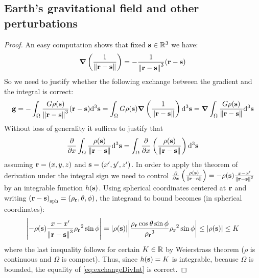 \documentclass[../main.tex]{subfiles}
\begin{document}
\subsection{Earth's gravitational field and other perturbations}\label{sec:app3}
\thmconservative*
\begin{proof}
  An easy computation shows that fixed $\boldsymbol{\mathrm{s}}\in\mathbb{R}^3$ we have:
  \begin{equation}
    \grad\left(\frac{1}{\left\|\boldsymbol{\mathrm{r}}-\boldsymbol{\mathrm{s}}\right\|}\right)=-\frac{1}{\left\|\boldsymbol{\mathrm{r}}-\boldsymbol{\mathrm{s}}\right\|^3}(\boldsymbol{\mathrm{r}}-\boldsymbol{\mathrm{s}})
  \end{equation}
  So we need to justify whether the following exchange between the gradient and the integral is correct:
  \begin{equation}
    \boldsymbol{\mathrm{g}}=-\int_{\Omega}\frac{G\rho(\boldsymbol{\mathrm{s}})}{\left\|\boldsymbol{\mathrm{r}}-\boldsymbol{\mathrm{s}}\right\|^3}(\boldsymbol{\mathrm{r}}-\boldsymbol{\mathrm{s}})\dd^3{\boldsymbol{\mathrm{s}}}=\int_{\Omega}G\rho(\boldsymbol{\mathrm{s}})\grad\left(\frac{1}{\left\|\boldsymbol{\mathrm{r}}-\boldsymbol{\mathrm{s}}\right\|}\right)\dd^3{\boldsymbol{\mathrm{s}}}=\grad\int_{\Omega}\frac{G\rho(\boldsymbol{\mathrm{s}})}{\left\|\boldsymbol{\mathrm{r}}-\boldsymbol{\mathrm{s}}\right\|}\dd^3{\boldsymbol{\mathrm{s}}}
  \end{equation}
  Without loss of generality it suffices to justify that
  \begin{equation}\label{eq:exchangeDivInt}
    \pdv{}{x}\int_{\Omega}\frac{\rho(\boldsymbol{\mathrm{s}})}{\left\|\boldsymbol{\mathrm{r}}-\boldsymbol{\mathrm{s}}\right\|}\dd^3{\boldsymbol{\mathrm{s}}}=\int_{\Omega}\pdv{}{x}\left(\frac{\rho(\boldsymbol{\mathrm{s}})}{\left\|\boldsymbol{\mathrm{r}}-\boldsymbol{\mathrm{s}}\right\|}\right)\dd^3{\boldsymbol{\mathrm{s}}}
  \end{equation}
  assuming $\boldsymbol{\mathrm{r}}=(x,y,z)$ and $\boldsymbol{\mathrm{s}}=(x',y',z')$. In order to apply the theorem of derivation under the integral sign we need to control $\pdv{}{x}\left(\frac{\rho(\boldsymbol{\mathrm{s}})}{\left\|\boldsymbol{\mathrm{r}}-\boldsymbol{\mathrm{s}}\right\|}\right)=-\rho(\boldsymbol{\mathrm{s}})\frac{x-x'}{\left\|\boldsymbol{\mathrm{r}}-\boldsymbol{\mathrm{s}}\right\|^3}$ by an integrable function $h(\boldsymbol{\mathrm{s}})$. Using spherical coordinates centered at $\boldsymbol{\mathrm{r}}$ and writing ${(\boldsymbol{\mathrm{r}}-\boldsymbol{\mathrm{s}})}_{\mathrm{sph}}=(\rho_{\boldsymbol{\mathrm{r}}},\theta,\phi)$, the integrand to bound becomes (in spherical coordinates):
  \begin{equation}
    \abs{-\rho(\boldsymbol{\mathrm{s}})\frac{x-x'}{\left\|\boldsymbol{\mathrm{r}}-\boldsymbol{\mathrm{s}}\right\|^3}{\rho_{\boldsymbol{\mathrm{r}}}}^2\sin\phi}=\abs{\rho(\boldsymbol{\mathrm{s}})}\abs{\frac{{\rho_{\boldsymbol{\mathrm{r}}}}\cos\theta\sin\phi}{{\rho_{\boldsymbol{\mathrm{r}}}}^3}{\rho_{\boldsymbol{\mathrm{r}}}}^2\sin\phi}\leq \abs{\rho(\boldsymbol{\mathrm{s}})}\leq K
  \end{equation}
  where the last inequality follows for certain $K\in\mathbb{R}$ by Weierstrass theorem ($\rho$ is continuous and $\Omega$ is compact). Thus, since $h(\boldsymbol{\mathrm{s}})=K$ is integrable, because $\Omega$ is bounded, the equality of \cref{eq:exchangeDivInt} is correct.
\end{proof}
\thmlaplace*
\end{document}
